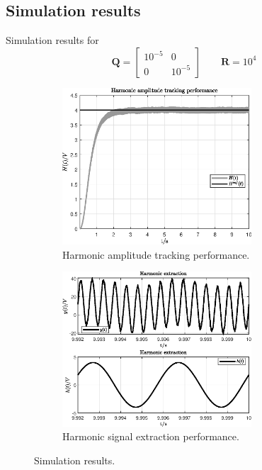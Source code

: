 \documentclass[11pt,a4paper,oneside]{book}
\numberwithin{equation}{section}
\theoremstyle{it}
\theoremstyle{definition}
\begin{document}
\subsection{Simulation results}
Simulation results for 
\begin{equation}
	\mathbf{Q}=\begin{bmatrix}
		10^{-5} & 0 \\ 0 & 10^{-5}
	\end{bmatrix} \qquad \mathbf{R}=10^4
\end{equation}
\begin{figure}[H]
	\centering
	\begin{subfigure}{.5\textwidth}
		\centering
		\includegraphics[width = 200pt, angle=0, 
		keepaspectratio]{figures/shaker/scalar/amplitude_track.eps}
		\captionsetup{width=.5\textwidth}
		\caption{Harmonic amplitude tracking performance.}
		\label{}
	\end{subfigure}%
	\begin{subfigure}{.5\textwidth}
		\centering
		\includegraphics[width = 200pt, angle=0, 
		keepaspectratio]{figures/shaker/scalar/harmonic_extraction.eps}
		\captionsetup{width=.5\textwidth}
		\caption{Harmonic signal extraction performance.}
		\label{}
	\end{subfigure}
	\caption{Simulation results.}
	\label{}
\end{figure}
\end{document}

